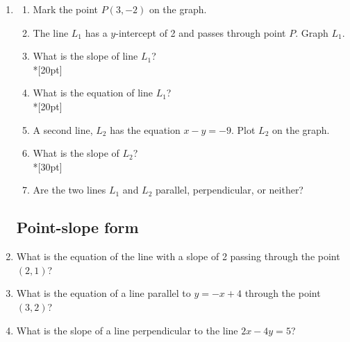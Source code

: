 \documentclass[12pt, oneside]{article}
\begin{document}
\begin{enumerate}
\newpage
\item
\begin{enumerate}
    \item Mark the point $P(3, -2)$ on the graph.
    \item The line $L_1$ has a $y$-intercept of 2 and passes through point $P$. Graph $L_1$.
    \item What is the slope of line $L_1$?\\*[20pt]
    \item What is the equation of line $L_1$?\\*[20pt]
    \item A second line, $L_2$ has the equation $x-y=-9$. Plot $L_2$ on the graph.
    \item What is the slope of $L_2$?\\*[30pt]
    \item Are the two lines $L_1$ and $L_2$ parallel, perpendicular, or neither?
  \begin{center} %
  \end{center}

\end{enumerate}

\newpage
\subsection*{Point-slope form}

  \item What is the equation of the line with a slope of 2 passing through the point $(2,1)$? \vspace{4cm}
  \item What is the equation of a line parallel to $y=-x+4$ through the point $(3, 2)$? \vspace{4cm}
  \item What is the slope of a line perpendicular to the line $2x-4y=5$? \vspace{4cm}

\newpage

\end{enumerate}
\end{document}
